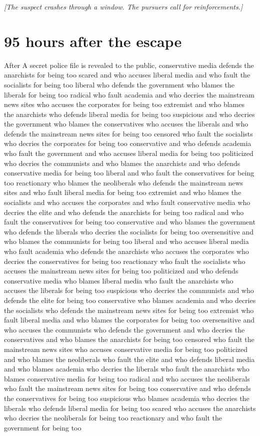 \documentclass{report}
\begin{document}
\textit{[The suspect crashes through a window. The pursuers call for reinforcements.]}


\section*{95 \small{hours after the escape}}

After A secret police file is revealed to the public, conservative media defends the anarchists for being too scared and who accuses liberal media and who fault the socialists for being too liberal who defends the government who blames the liberals for being too radical who fault academia and who decries the mainstream news sites who accuses the corporates for being too extremist and who blames the anarchists who defends liberal media for being too suspicious and who decries the government who blames the conservatives who accuses the liberals and who defends the mainstream news sites for being too censored who fault the socialists who decries the corporates for being too conservative and who defends academia who fault the government and who accuses liberal media for being too politicized who decries the communists and who blames the anarchists and who defends conservative media for being too liberal and who fault the conservatives for being too reactionary who blames the neoliberals who defends the mainstream news sites and who fault liberal media for being too extremist and who blames the socialists and who accuses the corporates and who fault conservative media who decries the elite and who defends the anarchists for being too radical and who fault the conservatives for being too conservative and who blames the government who defends the liberals who decries the socialists for being too oversensitive and who blames the communists for being too liberal and who accuses liberal media who fault academia who defends the anarchists who accuses the corporates who decries the conservatives for being too reactionary who fault the socialists who accuses the mainstream news sites for being too politicized and who defends conservative media who blames liberal media who fault the anarchists who accuses the liberals for being too suspicious who decries the communists and who defends the elite for being too conservative who blames academia and who decries the socialists who defends the mainstream news sites for being too extremist who fault liberal media and who blames the corporates for being too oversensitive and who accuses the communists who defends the government and who decries the conservatives and who blames the anarchists for being too censored who fault the mainstream news sites who accuses conservative media for being too politicized and who blames the neoliberals who fault the elite and who defends liberal media and who blames academia who decries the liberals who fault the anarchists who blames conservative media for being too radical and who accuses the neoliberals who fault the mainstream news sites for being too conservative and who defends the conservatives for being too suspicious who blames academia who decries the liberals who defends liberal media for being too scared who accuses the anarchists who decries the neoliberals for being too reactionary and who fault the government for being too 
\end{document}
